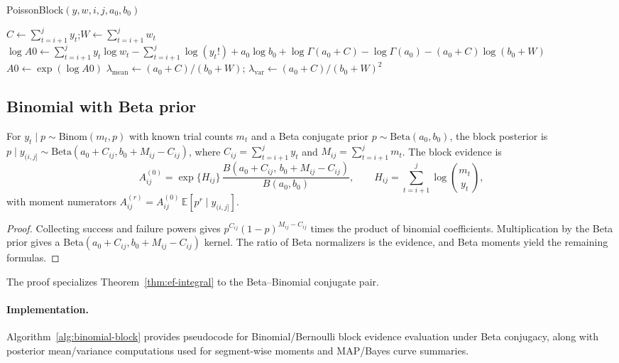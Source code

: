 \begin{algorithm}[H]
\caption{PoissonBlock$(y,w,i,j,a_0,b_0)$}
\label{alg:poisson-block}
\KwIn{Block $(i,j]$; counts $y_{i+1:j}$; exposures $w_{i+1:j}$}
$C\leftarrow \sum_{t=i+1}^j y_t$;\quad $W\leftarrow \sum_{t=i+1}^j w_t$\;
$\log A0 \leftarrow \sum_{t=i+1}^j y_t\log w_t
- \sum_{t=i+1}^j \log(y_t!)
+ a_0\log b_0
+ \log\Gamma(a_0+C)
- \log\Gamma(a_0)
- (a_0+C)\log(b_0+W)$\;
$A0\leftarrow \exp(\log A0)$\;
$\lambda_{\text{mean}}\leftarrow (a_0+C)/(b_0+W)$;\quad
$\lambda_{\text{var}}\leftarrow (a_0+C)/(b_0+W)^2$\;
\end{algorithm}

\subsection{Binomial with Beta prior}
\label{sec:family-binomial}

\begin{proposition}
\label{prop:binomial-block}
For $y_t\mid p\sim\mathrm{Binom}(m_t,p)$ with known trial counts $m_t$ and a Beta conjugate prior
$p\sim\mathrm{Beta}(a_0,b_0)$, the block posterior is
$p\mid y_{(i,j]}\sim\mathrm{Beta}(a_0+C_{ij},b_0+M_{ij}-C_{ij})$, where
$C_{ij}=\sum_{t=i+1}^j y_t$ and $M_{ij}=\sum_{t=i+1}^j m_t$. The block evidence is
\[
A^{(0)}_{ij}
= \exp\{H_{ij}\}\,
\frac{B(a_0+C_{ij},\,b_0+M_{ij}-C_{ij})}{B(a_0,b_0)},
\qquad H_{ij}=\sum_{t=i+1}^j \log\binom{m_t}{y_t},
\]
with moment numerators $A^{(r)}_{ij}=A^{(0)}_{ij}\,\mathbb{E}[p^r\mid y_{(i,j]}]$.
\end{proposition}
\begin{proof}
Collecting success and failure powers gives
$p^{C_{ij}}(1-p)^{M_{ij}-C_{ij}}$ times the product of binomial coefficients. Multiplication by the
Beta prior gives a Beta$(a_0+C_{ij},b_0+M_{ij}-C_{ij})$ kernel. The ratio of Beta normalizers is the
evidence, and Beta moments yield the remaining formulas.
\end{proof}

The proof specializes Theorem~\ref{thm:ef-integral} to the Beta--Binomial conjugate pair.

\paragraph{Implementation.}
Algorithm~\ref{alg:binomial-block} provides pseudocode for Binomial/Bernoulli block evidence evaluation under Beta conjugacy, along with posterior mean/variance computations used for segment-wise moments and MAP/Bayes curve summaries.

